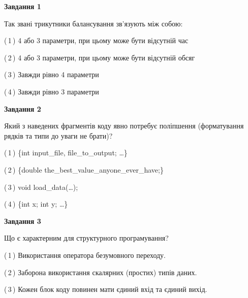 \documentclass[10pt, ukrainian]{article}
\begin{document}
{
\begin {large}
{\begin {center}\textbf{Завдання 1}\end {center}}\par
Так звані трикутники балансування зв'язують між собою:\par
\vspace{2mm}



(\,1\,) 4 або 3 параметри, при цьому може бути відсутній час%



(\,2\,) 4 або 3 параметри, при цьому може бути відсутній обсяг %



(\,3\,) Завжди рівно 4 параметри%



(\,4\,) Завжди рівно 3 параметри%


{\begin {center}\textbf{Завдання 2}\end {center}}\par
Який з наведених фрагментів коду явно потребує поліпшення (форматування рядків та типи до уваги не брати)?\par
\vspace{2mm}



(\,1\,) \{int input\_file, file\_to\_output; …\}%



(\,2\,) \{double the\_best\_value\_anyone\_ever\_have;\} %



(\,3\,) void load\_data(…);%



(\,4\,) \{int x; int y; …\}%


{\begin {center}\textbf{Завдання 3}\end {center}}\par
Що є характерним для структурного програмування?\par
\vspace{2mm}



(\,1\,) Використання оператора безумовного переходу. %



(\,2\,) Заборона використання скалярних (простих) типів даних. %



(\,3\,) Кожен блок коду повинен мати єдиний вхід та єдиний вихід.%




\end{large}}
\end{document}
